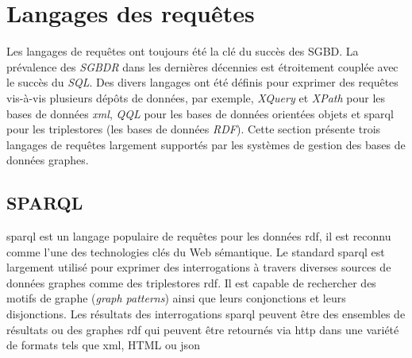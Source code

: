 

\section{Langages des requêtes}
\label{sec:query-languages}
Les langages de requêtes ont toujours été la clé du succès des
\acrshort{SGBD}. La prévalence des \emph{\acrshort{SGBDR}} dans les
dernières décennies est étroitement couplée avec le succès du
\emph{SQL}. Des divers langages ont été définis pour exprimer des
requêtes vis-à-vis plusieurs dépôts de données, par exemple,
\emph{XQuery} \cite{boag2002xquery} et \emph{XPath}
\cite{clark1999xml} pour les bases de données \emph{\acrshort{xml}},
\emph{QQL} \cite{alashqur1989oql} pour les bases de données orientées
objets et \acrshort{sparql} \cite{prud2008sparql} pour les
triplestores (les bases de données \emph{RDF}). Cette section présente
trois langages de requêtes largement supportés par les systèmes de
gestion des bases de données graphes.

% 


  \subsection{SPARQL}
  \label{sec:sparql}
  \acrshort{sparql} \cite{prud2008sparql} est un langage populaire de
  requêtes pour les données \acrshort{rdf}, il est reconnu comme l'une
  des technologies clés du Web sémantique. Le standard
  \acrshort{sparql} est largement utilisé pour exprimer des
  interrogations à travers diverses sources de données graphes comme
  des triplestores \acrshort{rdf}. Il est capable de rechercher des
  motifs de graphe (\emph{graph patterns}) ainsi que leurs
  conjonctions et leurs disjonctions. Les résultats des interrogations
  \acrshort{sparql} peuvent être des ensembles de résultats ou des
  graphes \acrshort{rdf} qui peuvent être retournés via
  \acrshort{http} dans une variété de formats tels que \acrshort{xml},
  HTML ou \acrshort{json}\medskip

